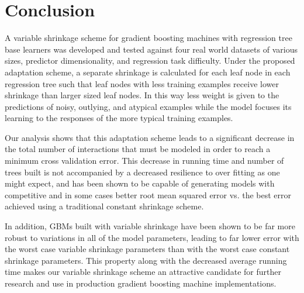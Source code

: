 \documentclass[9pt, conference]{IEEEtran}
\begin{document}
\section{Conclusion}

A variable shrinkage scheme for gradient boosting machines with regression tree base learners was developed and tested against four real world datasets of various sizes, predictor dimensionality, and regression task difficulty. Under the proposed adaptation scheme, a separate shrinkage is calculated for each leaf node in each regression tree such that leaf nodes with less training examples receive lower shrinkage than larger sized leaf nodes. In this way less weight is given to the predictions of noisy, outlying, and atypical examples while the model focuses its learning to the responses of the more typical training examples. 

Our analysis shows that this adaptation scheme leads to a significant decrease in the total number of interactions that must be modeled in order to reach a minimum cross validation error. This decrease in running time and number of trees built is not accompanied by a decreased resilience to over fitting as one might expect, and has been shown to be capable of generating models with competitive and in some cases better root mean squared error vs. the best error achieved using a traditional constant shrinkage scheme.  

In addition, GBMs built with variable shrinkage have been shown to be far more robust to variations in all of the model parameters, leading to far lower error with the worst case variable shrinkage parameters than with the worst case constant shrinkage parameters. This property along with the decreased average running time makes our variable shrinkage scheme an attractive candidate for further research and use in production gradient boosting machine implementations.





	

\end{document}
